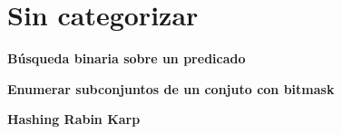 \section{Sin categorizar}
    \textbf{Búsqueda binaria sobre un predicado}
    

    \textbf{Enumerar subconjuntos de un conjuto con bitmask}
    

    \textbf{Hashing Rabin Karp}
    